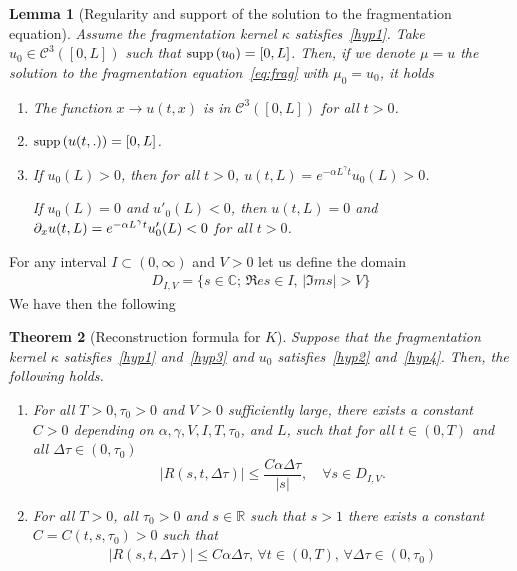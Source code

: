 \documentclass[10pt]{amsart}
\newtheorem{theo}{Theorem}[section]
\newtheorem{lemm}[theo]{Lemma}\newtheorem{prop}[theo]{Proposition}\newtheorem{coro}[theo]{Corollary}\newtheorem{conj}[theo]{Conjecture}
\theoremstyle{definition}\newtheorem{defi}[theo]{Definition}\newtheorem{rema}[theo]{Remark}\newtheorem{exam}[theo]{Example}\newtheorem{exem}[theo]{Example}\newtheorem{nota}[theo]{Notation}
\newcommand*\p{\partial}
\renewcommand*\a{\alpha}
\newcommand*\R{\mathbb{R}}
\newcommand*\C{\mathbb{C}}
\newcommand{\clC}{\mathcal{C}}
\newcommand*\supp{{\mbox{\small\rm supp}}\,}
\newcommand*{\relabel}{\renewcommand{\labelenumi}{(\theenumi)}}
\newcommand*{\romanenumi}{\renewcommand*{\theenumi}{\roman{enumi}}\relabel}
\let\oldforall\forall
\renewcommand*{\forall}{\mathrel{\oldforall}}
\begin{document}
\begin{lemm}[Regularity and support of the solution to the fragmentation equation]\label{lemma:prop}
Assume the fragmentation kernel $\kappa$ satisfies~\eqref{hyp1}. Take $u_0 \in \clC^3([0,L])$ such that $\supp(u_0)=[0,L]$. Then, if we denote $\mu = u$ the solution to the fragmentation equation~\eqref{eq:frag} with $\mu _0=u_0$, it holds
\begin{enumerate}
\item\label{1} The function $x \to u(t,x)$ is in $\clC^3([0,L])$ for all $t>0$.
\item $\supp(u(t,.)) = [0,L]$.
\item If $u_0(L)>0$, then for all $t>0$, $u(t,L)= e^{-\a L^{\gamma}t}u_0(L)>0$.

If $u_0(L)=0$ and $u'_0(L)<0$, then $u(t,L)=0$ and $\p_x u(t,L)= e^{-\a L^{\gamma}t}u'_0(L)\linebreak<0$ for all $t>0$.
\end{enumerate}
\end{lemm}


For any interval $I\subset (0, \infty)$ and $V>0$ let us define the domain
\begin{align*}
D_{I, V}=\{s\in \C;\,\Re e s\in I,\,|\Im m s|>V \}
\end{align*}
We have then the following


\begin{theo}[Reconstruction formula for $K$]\label{thm:reco}
Suppose that the fragmentation kernel $\kappa $ satisfies~\eqref{hyp1} and~\eqref{hyp3} and $u_0$ satisfies~\eqref{hyp2} and~\eqref{hyp4}. Then, the following holds.
\begin{enumerate}\romanenumi
\item\label{theo4.4.1} For all $T>0, \tau _0>0$ and $V>0$ sufficiently large, there exists a constant $C>0$ depending on $\alpha, \gamma, V, I, T, \tau _0$, and $L$, such that for all $t\in (0, T)$ and all $\Delta \tau \in (0, \tau _0)$
\begin{equation}\label{thm:recoE1}
|R(s,t,\Delta \tau)|
\leq
\dfrac{C\a \Delta \tau }{|s|},
\quad \forall s\in D _{I, V}.
\end{equation}
\item\label{theo4.4.2} For all $T>0$, all $\tau _0>0$ and $s\in \R$ such that $s>1$ there exists a constant $C=C(t, s, \tau _0)>0$ such that
\begin{align}\label{thm:recoE15}
|R(s, t, \Delta \tau)|\le C\alpha \Delta \tau,\,\forall t\in (0, T),\,\forall \Delta \tau\in (0, \tau _0)
\end{align}
\end{enumerate}
\end{theo}
\end{document}
